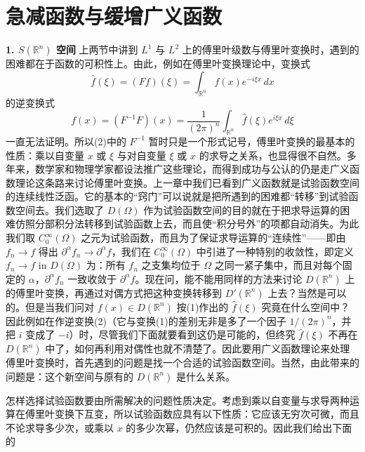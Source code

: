 \section{急减函数与缓增广义函数}

\noindent\textbf{1. $S(\mathbb R^n)$ 空间}\quad
上两节中讲到 $L^1$ 与 $L^2$ 上的傅里叶级数与傅里叶变换时，遇到的困难都在于函数的可积性上。由此，例如在傅里叶变换理论中，变换式
\begin{equation}
 \widehat f(\xi)=(Ff)(\xi)=\int_{\mathbb R^n}f(x)e^{-i\xi x}\,dx
 \tag{1}
\end{equation}
的逆变换式
\begin{equation}
 f(x)=(F^{-1}F)(x)=\frac1{(2\pi)^n}\int_{\mathbb R^n}\widehat f(\xi)e^{i\xi x}\,d\xi
 \tag{2}
\end{equation}
一直无法证明。所以(2)中的 $F^{-1}$ 暂时只是一个形式记号，傅里叶变换的最基本的性质：乘以自变量 $x$ 或 $\xi$ 与对自变量 $\xi$ 或 $x$ 的求导之关系，也显得很不自然。多年来，数学家和物理学家都设法推广这些理论，而得到成功与公认的仍是走广义函数理论这条路来讨论傅里叶变换。上一章中我们已看到广义函数就是试验函数空间的连续线性泛函。它的基本的“窍门”可以说就是把所遇到的困难都“转移”到试验函数空间去。我们选取了 $D(\Omega)$ 作为试验函数空间的目的就在于把求导运算的困难仿照分部积分法转移到试验函数上去，而且使“积分号外”的项都自动消失。为此我们取 $C_0^\infty(\Omega)$ 之元为试验函数，而且为了保证求导运算的“连续性”——即由 $f_n\to f$ 得出 $\partial^\alpha f_n\to\partial^\alpha f$，我们在 $C_0^\infty(\Omega)$ 中引进了一种特别的收敛性，即定义 $f_n\to f$ in $D(\Omega)$ 为：所有 $f_n$ 之支集均位于 $\Omega$ 之同一紧子集中，而且对每个固定的 $\alpha$，$\partial^\alpha f_n$ 一致收敛于 $\partial^\alpha f$。现在问，能不能用同样的方法来讨论 $D(\mathbb R^n)$ 上的傅里叶变换，再通过对偶方式把这种变换转移到 $D'(\mathbb R^n)$ 上去？当然是可以的。但是当我们问对 $f(x)\in D(\mathbb R^n)$ 按(1)作出的 $\widehat f(\xi)$ 究竟在什么空间中？因此例如在作逆变换(2)（它与变换(1)的差别无非是多了一个因子 $1/(2\pi)^n$，并把 $i$ 变成了 $-i$）时，尽管我们下面就要看到这仍是可能的，但终究 $\widehat f(\xi)$ 不再在 $D(\mathbb R^n)$ 中了，如何再利用对偶性也就不清楚了。因此要用广义函数理论来处理傅里叶变换时，首先遇到的问题是找一个合适的试验函数空间。当然，由此带来的问题是：这个新空间与原有的 $D(\mathbb R^n)$ 是什么关系。

怎样选择试验函数要由所需解决的问题性质决定。考虑到乘以自变量与求导两种运算在傅里叶变换下互变，所以试验函数应具有以下性质：它应该无穷次可微，而且不论求导多少次，或乘以 $x$ 的多少次幂，仍然应该是可积的。因此我们给出下面的

